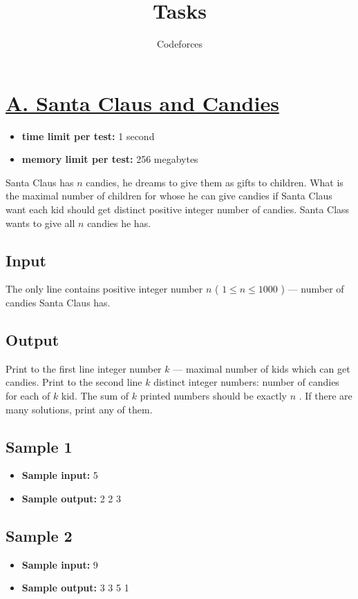 \documentclass{article}
\date{}
\title{Tasks}
\author{Codeforces}
\begin{document}
\maketitle
\section{\href{https://codeforces.com/problemset/problem/753/A}{A. Santa Claus and Candies}}

\begin{itemize}
\item \textbf{time limit per test:} 1 second
\item \textbf{memory limit per test:} 256 megabytes
\end{itemize}
Santa Claus has $n$ candies, he dreams to give them as gifts to children. What is the maximal number of children for whose he can give candies if Santa Claus want each kid should get distinct positive integer number of candies. Santa Class wants to give all $n$ candies he has.

\subsection*{Input}
 The only line contains positive integer number $n$ ( $1 \leq n \leq 1000$ ) — number of candies Santa Claus has.

\subsection*{Output}
 Print to the first line integer number $k$ — maximal number of kids which can get candies. Print to the second line $k$ distinct integer numbers: number of candies for each of $k$ kid. The sum of $k$ printed numbers should be exactly $n$ . If there are many solutions, print any of them.

\subsection*{Sample 1}
\begin{itemize}
\item \textbf{Sample input:} 
5
\item \textbf{Sample output:} 
2
2 3
\end{itemize}
\subsection*{Sample 2}
\begin{itemize}
\item \textbf{Sample input:} 
9
\item \textbf{Sample output:} 
3
3 5 1
\end{itemize}
\end{document}
